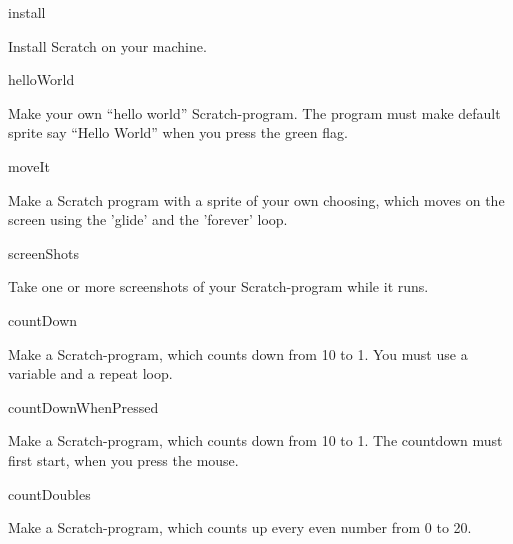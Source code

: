 \begin{defproblem}{install}
  \begin{onlyproblem}
    Install Scratch on your machine.
  \end{onlyproblem}
\end{defproblem}

\begin{defproblem}{helloWorld}
  \begin{onlyproblem}
    Make your own ``hello world'' Scratch-program. The program must make
    default sprite say ``Hello World'' when you press the green flag.
  \end{onlyproblem}
\end{defproblem}

\begin{defproblem}{moveIt}
  \begin{onlyproblem}
    Make a Scratch program with a sprite of your own choosing, which
    moves on the screen using the 'glide' and the 'forever' loop.
  \end{onlyproblem}
\end{defproblem}

\begin{defproblem}{screenShots}
  \begin{onlyproblem}
    Take one or more screenshots of your Scratch-program while it runs.
  \end{onlyproblem}
\end{defproblem}

\begin{defproblem}{countDown}
  \begin{onlyproblem}
    Make a Scratch-program, which counts down from 10 to 1. You must use a
    variable and a repeat loop.
  \end{onlyproblem}
\end{defproblem}

\begin{defproblem}{countDownWhenPressed}
  \begin{onlyproblem}
    Make a Scratch-program, which counts down from 10 to 1. The countdown must
    first start, when you press the mouse.
  \end{onlyproblem}
\end{defproblem}

\begin{defproblem}{countDoubles}
  \begin{onlyproblem}
    Make a Scratch-program, which counts up every even number from 0 to 20.
  \end{onlyproblem}
\end{defproblem}

